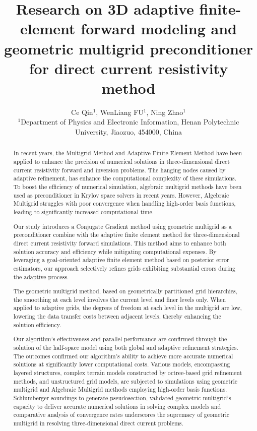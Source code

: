 \documentclass[extra, referee]{gji}
\begin{document}
  
\title{Research on 3D adaptive finite-element forward modeling and geometric multigrid preconditioner for direct current resistivity method}
\author[Ce Qin]{Ce Qin$^{1}$, WenLiang FU$^{1}$, Ning Zhao$^{1}$ \\
  $^{1}$Department of Physics and Electronic Information,
  Henan Polytechnic University, Jiaozuo, 454000, China
}

\maketitle

\begin{abstract}
In recent years, the Multigrid Method and Adaptive Finite Element Method have
been  applied to enhance the precision of numerical solutions in
three-dimensional direct current resistivity forward and inversion problems. The
hanging nodes caused by adaptive refinement, has enhance the computational
complexity of these simulations. To boost the efficiency of numerical
simulation, algebraic multigrid methods have been used as preconditioner in
Krylov space solvers in recent years. However, Algebraic Multigrid struggles
with poor convergence when handling high-order basis functions, leading to
significantly increased computational time.

Our study introduces a Conjugate Gradient method using geometric multigrid as a
preconditioner combine with the adaptive finite element method for
three-dimensional direct current resistivity forward simulations. This method
aims to enhance both solution accuracy and efficiency while mitigating
computational expenses. By leveraging a goal-oriented adaptive finite element
method based on posterior error estimators, our approach selectively refines
grids exhibiting substantial errors during the adaptive process.

The geometric multigrid method, based on geometrically partitioned grid
hierarchies, the smoothing at each level involves the current level and finer
levels only. When applied to adaptive grids, the degrees of freedom at each
level in the multigrid are low, lowering the data transfer costs between
adjacent levels, thereby enhancing the solution efficiency.

Our algorithm's effectiveness and parallel performance are confirmed through the
solution of the half-space model using both global and adaptive refinement
strategies. The outcomes confirmed our algorithm's ability to achieve more
accurate numerical solutions at significantly lower computational costs. Various
models, encompassing layered structures, complex terrain models constructed by
octree-based grid refinement methods, and unstructured grid models, are
subjected to simulations using geometric multigrid and Algebraic Multigrid
methods employing high-order basis functions. Schlumberger soundings to generate
pseudosection, validated geometric multigrid's capacity to deliver accurate
numerical solutions in solving complex models and comparative analysis of
convergence rates underscores the supremacy of geometric multigrid in resolving
three-dimensional direct current problems.


\end{abstract}
\end{document}
